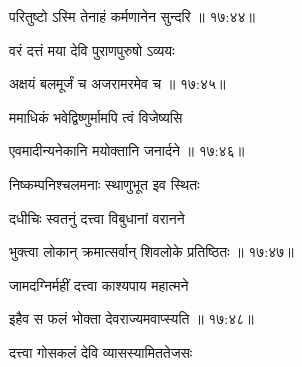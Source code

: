 
{\devanagarifont परितुष्टो ऽस्मि तेनाहं कर्मणानेन सुन्दरि {॥ १७:४४॥} \veg\dontdisplaylinenum }%

{\devanagarifont वरं दत्तं मया देवि पुराणपुरुषो ऽव्ययः \thinspace{\dandab} \dontdisplaylinenum }%


{\devanagarifont अक्षयं बलमूर्जं च अजरामरमेव च {॥ १७:४५॥} \veg\dontdisplaylinenum }%
 
{\devanagarifont ममाधिकं भवेद्विष्णुर्मामपि त्वं विजेष्यसि \thinspace{\dandab} \dontdisplaylinenum }%


{\devanagarifont एवमादीन्यनेकानि मयोक्तानि जनार्दने {॥ १७:४६॥} \veg\dontdisplaylinenum }%
 
{\devanagarifont निष्कम्पनिश्चलमनाः स्थाणुभूत इव स्थितः \thinspace{\dandab} \dontdisplaylinenum }%

{\devanagarifont दधीचिः स्वतनुं दत्त्वा विबुधानां वरानने  \danda\dontdisplaylinenum }%


{\devanagarifont भुक्त्वा लोकान् क्रमात्सर्वान् शिवलोके प्रतिष्ठितः {॥ १७:४७॥} \veg\dontdisplaylinenum }%
 

{\devanagarifont जामदग्निर्महीं दत्त्वा काश्यपाय महात्मने \thinspace{\dandab} \dontdisplaylinenum }%
 

{\devanagarifont इहैव स फलं भोक्ता देवराज्यमवाप्स्यति {॥ १७:४८॥} \veg\dontdisplaylinenum }%
 
{\devanagarifont दत्त्वा गोसकलं देवि व्यासस्यामिततेजसः \thinspace{\dandab} \dontdisplaylinenum }%

